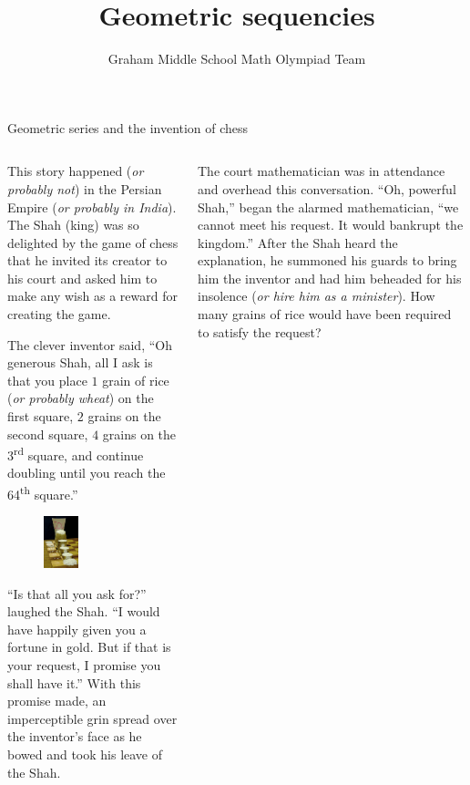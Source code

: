 \documentclass[9pt,aspectratio=169]{beamer}
\title{Geometric sequencies}
\subtitle[Graham Middle School]{Graham Middle School Math Olympiad Team}
\begin{document}
\maketitle

\begin{frame}{Geometric series and the invention of chess}
  \begin{columns}[T]
    \begin{column}{0.5\textwidth}
      This story happened (\emph{or probably not}) in the Persian Empire (\emph{or probably in India}).  The Shah (king) was so delighted by the game of chess that he invited its creator to his court and asked him to make any wish as a reward for creating the game.  

      The clever inventor said, “Oh generous Shah, all I ask is that you place $1$ grain of rice (\emph{or probably wheat}) on the first square, $2$ grains on the second square, $4$ grains on the 3\textsuperscript{rd} square, and continue doubling until you reach the 64\textsuperscript{th} square.”
      \begin{figure}
        \vspace*{-1.5em}
        \includegraphics[width=0.35\textwidth]{07 - Geometric Sequences/rice.jpg}
      \end{figure}
      “Is that all you ask for?” laughed the Shah.  “I would have happily given you a fortune in gold.  But if that is your request, I promise you shall have it.”  With this promise made, an imperceptible grin spread over the inventor’s face as he bowed and took his leave of the Shah. 
    \end{column}
    \begin{column}{0.5\textwidth}
      The court mathematician was in attendance and overhead this conversation.  “Oh, powerful Shah,” began the alarmed mathematician, “we cannot meet his request.  It would bankrupt the kingdom.”  After the Shah heard the explanation, he summoned his guards to bring him the inventor and had him beheaded for his insolence (\emph{or hire him as a minister}).  How many grains of rice would have been required to satisfy the request?


\end{column}
\end{columns}
\end{frame}
\end{document}
